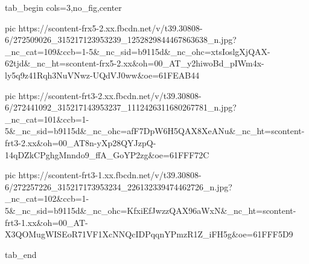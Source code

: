  
 
 
 
 


\ifcmt
  tab_begin cols=3,no_fig,center

     pic https://scontent-frx5-2.xx.fbcdn.net/v/t39.30808-6/272509026_315217123953239_1252829844467863638_n.jpg?_nc_cat=109&ccb=1-5&_nc_sid=b9115d&_nc_ohc=xtsIoslgXjQAX-62tjd&_nc_ht=scontent-frx5-2.xx&oh=00_AT_y2hiwoBd_pIWm4x-ly5q9z41Rqh3NuVNwz-UQdVJ0ww&oe=61FEAB44

     pic https://scontent-frt3-2.xx.fbcdn.net/v/t39.30808-6/272441092_315217143953237_1112426311680267781_n.jpg?_nc_cat=101&ccb=1-5&_nc_sid=b9115d&_nc_ohc=afF7DpW6H5QAX8XeANu&_nc_ht=scontent-frt3-2.xx&oh=00_AT8n-yXp28QYJzpQ-14qDZkCPghgMnndo9_ffA_GoYP2zg&oe=61FFF72C

     pic https://scontent-frt3-1.xx.fbcdn.net/v/t39.30808-6/272257226_315217173953234_226132339474462726_n.jpg?_nc_cat=102&ccb=1-5&_nc_sid=b9115d&_nc_ohc=KfxiEfJwzzQAX96aWxN&_nc_ht=scontent-frt3-1.xx&oh=00_AT-X3QOMugWISEoR71VF1XcNNQcIDPqqnYPmzR1Z_iFH5g&oe=61FFF5D9

  tab_end
\fi
